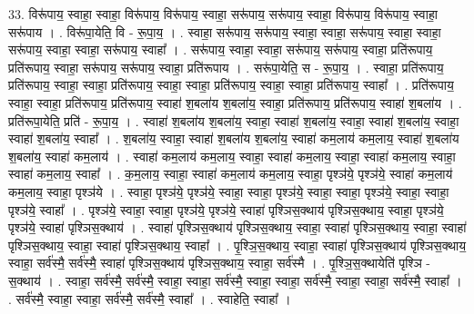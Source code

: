 \documentclass[17pt]{extarticle}
\begin{document}
33. विरू॑पाय॒ स्वाहा॒ स्वाहा॒ विरू॑पाय॒ विरू॑पाय॒ स्वाहा॒ सरू॑पाय॒ सरू॑पाय॒ स्वाहा॒ विरू॑पाय॒ विरू॑पाय॒ स्वाहा॒ सरू॑पाय । . विरू॑पा॒येति॒ वि - रू॒पा॒य॒ । . स्वाहा॒ सरू॑पाय॒ सरू॑पाय॒ स्वाहा॒ स्वाहा॒ सरू॑पाय॒ स्वाहा॒ स्वाहा॒ सरू॑पाय॒ स्वाहा॒ स्वाहा॒ सरू॑पाय॒ स्वाहा᳚ । . सरू॑पाय॒ स्वाहा॒ स्वाहा॒ सरू॑पाय॒ सरू॑पाय॒ स्वाहा॒ प्रति॑रूपाय॒ प्रति॑रूपाय॒ स्वाहा॒ सरू॑पाय॒ सरू॑पाय॒ स्वाहा॒ प्रति॑रूपाय । . सरू॑पा॒येति॒ स - रू॒पा॒य॒ । . स्वाहा॒ प्रति॑रूपाय॒ प्रति॑रूपाय॒ स्वाहा॒ स्वाहा॒ प्रति॑रूपाय॒ स्वाहा॒ स्वाहा॒ प्रति॑रूपाय॒ स्वाहा॒ स्वाहा॒ प्रति॑रूपाय॒ स्वाहा᳚ । . प्रति॑रूपाय॒ स्वाहा॒ स्वाहा॒ प्रति॑रूपाय॒ प्रति॑रूपाय॒ स्वाहा॑ श॒बला॑य श॒बला॑य॒ स्वाहा॒ प्रति॑रूपाय॒ प्रति॑रूपाय॒ स्वाहा॑ श॒बला॑य । . प्रति॑रूपा॒येति॒ प्रति॑ - रू॒पा॒य॒ । . स्वाहा॑ श॒बला॑य श॒बला॑य॒ स्वाहा॒ स्वाहा॑ श॒बला॑य॒ स्वाहा॒ स्वाहा॑ श॒बला॑य॒ स्वाहा॒ स्वाहा॑ श॒बला॑य॒ स्वाहा᳚ । . श॒बला॑य॒ स्वाहा॒ स्वाहा॑ श॒बला॑य श॒बला॑य॒ स्वाहा॑ कम॒लाय॑ कम॒लाय॒ स्वाहा॑ श॒बला॑य श॒बला॑य॒ स्वाहा॑ कम॒लाय॑ । . स्वाहा॑ कम॒लाय॑ कम॒लाय॒ स्वाहा॒ स्वाहा॑ कम॒लाय॒ स्वाहा॒ स्वाहा॑ कम॒लाय॒ स्वाहा॒ स्वाहा॑ कम॒लाय॒ स्वाहा᳚ । . क॒म॒लाय॒ स्वाहा॒ स्वाहा॑ कम॒लाय॑ कम॒लाय॒ स्वाहा॒ पृश्ञ॑ये॒ पृश्ञ॑ये॒ स्वाहा॑ कम॒लाय॑ कम॒लाय॒ स्वाहा॒ पृश्ञ॑ये । . स्वाहा॒ पृश्ञ॑ये॒ पृश्ञ॑ये॒ स्वाहा॒ स्वाहा॒ पृश्ञ॑ये॒ स्वाहा॒ स्वाहा॒ पृश्ञ॑ये॒ स्वाहा॒ स्वाहा॒ पृश्ञ॑ये॒ स्वाहा᳚ । . पृश्ञ॑ये॒ स्वाहा॒ स्वाहा॒ पृश्ञ॑ये॒ पृश्ञ॑ये॒ स्वाहा॑ पृश्ञिस॒क्थाय॑ पृश्ञिस॒क्थाय॒ स्वाहा॒ पृश्ञ॑ये॒ पृश्ञ॑ये॒ स्वाहा॑ पृश्ञिस॒क्थाय॑ । . स्वाहा॑ पृश्ञिस॒क्थाय॑ पृश्ञिस॒क्थाय॒ स्वाहा॒ स्वाहा॑ पृश्ञिस॒क्थाय॒ स्वाहा॒ स्वाहा॑ पृश्ञिस॒क्थाय॒ स्वाहा॒ स्वाहा॑ पृश्ञिस॒क्थाय॒ स्वाहा᳚ । . पृ॒श्ञि॒स॒क्थाय॒ स्वाहा॒ स्वाहा॑ पृश्ञिस॒क्थाय॑ पृश्ञिस॒क्थाय॒ स्वाहा॒ सर्व॑स्मै॒ सर्व॑स्मै॒ स्वाहा॑ पृश्ञिस॒क्थाय॑ पृश्ञिस॒क्थाय॒ स्वाहा॒ सर्व॑स्मै । . पृ॒श्ञि॒स॒क्थायेति॑ पृश्ञि - स॒क्थाय॑ । . स्वाहा॒ सर्व॑स्मै॒ सर्व॑स्मै॒ स्वाहा॒ स्वाहा॒ सर्व॑स्मै॒ स्वाहा॒ स्वाहा॒ सर्व॑स्मै॒ स्वाहा॒ स्वाहा॒ सर्व॑स्मै॒ स्वाहा᳚ । . सर्व॑स्मै॒ स्वाहा॒ स्वाहा॒ सर्व॑स्मै॒ सर्व॑स्मै॒ स्वाहा᳚ । . स्वाहेति॒ स्वाहा᳚ । \newline
\pagebreak
{}
\end{document}
